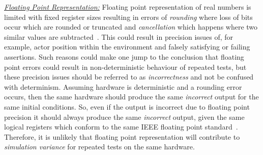 \documentclass[letterpaper, 10 pt, journal, twoside]{IEEEtran}
\begin{document}
\noindent\underline{\textit{Floating Point Representation:}}
Floating point representation of real numbers is limited with fixed register sizes resulting in errors of \textit{rounding} where loss of bits occur which are rounded or truncated and \textit{cancellation} which happens where two similar values are subtracted~\cite{FloatingPointsBook,goldberg1991every}. 
%
This could result in precision issues of, for example, actor position within the environment and falsely satisfying or failing assertions. Such reasons could  make one jump to the conclusion that floating point errors could result in non-deterministic behaviour of repeated tests, but these precision issues should be referred to as \textit{incorrectness} and not be confused with determinism. Assuming hardware is deterministic and a rounding error occurs, then the same hardware should produce the same \textit{incorrect} output for the same initial conditions. So, even if the output is incorrect due to floating point precision it should always produce the same \textit{incorrect} output, given the same logical registers which conform to the same IEEE floating point standard~\cite{8766229}. Therefore, it is unlikely that floating point representation will contribute to \textit{simulation variance} for repeated tests on the same hardware.
%
%
%
\end{document}
